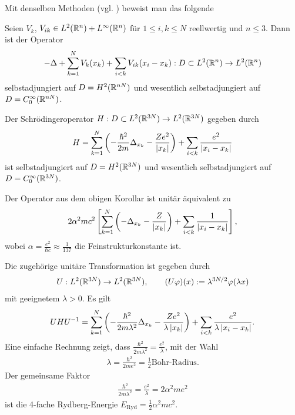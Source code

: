 Mit denselben Methoden (vgl. \cite{RS05b}) beweist man das folgende
\begin{thm*}
Seien $V_k$, $V_{ik}\in L^2(\mathbb{R}^n) + L^\infty(\mathbb{R}^n)$ für $1\le i,k \le N$
reellwertig und $n\le 3$. Dann ist der Operator
\begin{align*}
-\Delta + \sum_{k=1}^N V_k(x_k) + \sum_{i<k} V_{ik}(x_i-x_k)
: D \subset L^2(\mathbb{R}^n)\to L^2(\mathbb{R}^n)
\end{align*}
selbstadjungiert auf $D=H^2(\mathbb{R}^{nN})$ und wesentlich selbstadjungiert auf
$D=C_0^\infty(\mathbb{R}^{nN})$.\fishhere
\end{thm*}

\begin{cor*}
Der Schrödingeroperator $H: D\subset L^2(\mathbb{R}^{3N})\to L^2(\mathbb{R}^{3N})$ gegeben durch
\begin{align*}
H=\sum_{k=1}^N \left(-\frac{\hbar^2}{2m}\Delta_{x_k}-\frac{Ze^2}{\left|x_k\right|}
\right) + \sum_{i<k} \frac{e^2}{\left|x_i-x_k\right|}
\end{align*}
ist selbstadjungiert auf $D=H^2(\mathbb{R}^{3N})$ und wesentlich selbstadjungiert auf
$D=C_0^\infty(\mathbb{R}^{3N})$.\fishhere
\end{cor*}

\begin{bem*}
Der Operator aus dem obigen Korollar ist unitär äquivalent zu
\begin{align*}
2\alpha^2mc^2\left[ \sum_{k=1}^N \left(-\Delta_{x_k} -
\frac{Z}{\left|x_k\right|}\right) + \sum_{i<k} \frac{1}{\left|x_i-x_k\right|}
\right],
\end{align*}
wobei $\alpha= \frac{e^2}{\hbar c} \approx \frac{1}{137}$ die
Feinstrukturkonstante ist.

Die zugehörige unitäre Transformation ist gegeben durch
\begin{align*}
U: L^2(\mathbb{R}^{3N}) \to L^2(\mathbb{R}^{3N}),\qquad (U\varphi)(x) := \lambda^{3N/2}\varphi(\lambda
x)
\end{align*}
mit geeignetem $\lambda > 0$. Es gilt
\begin{align*}
UHU^{-1} = \sum_{k=1}^N \left(-\frac{\hbar^2}{2m\lambda^2}\Delta_{x_k} -
\frac{Ze^2}{\lambda \left|x_k\right|}\right) + \sum_{i< k}
\frac{e^2}{\lambda\left|x_i-x_k\right|}.
\end{align*}
Eine einfache Rechnung zeigt, dass
$\frac{\hbar^2}{2m\lambda^2}=\frac{e^2}{\lambda}$, mit der Wahl
\begin{align*}
\lambda = \frac{\hbar^2}{2me^2} = \frac{1}{2}\text{Bohr-Radius}.
\end{align*}
Der gemeinsame Faktor
\begin{align*}
\frac{\hbar^2}{2m\lambda^2} = \frac{e^2}{\lambda} = 2\alpha^2me^2
\end{align*}
ist die 4-fache Rydberg-Energie $E_{\mathrm{Ryd}} =
\frac{1}{2}\alpha^2mc^2$.\maphere
\end{bem*}
